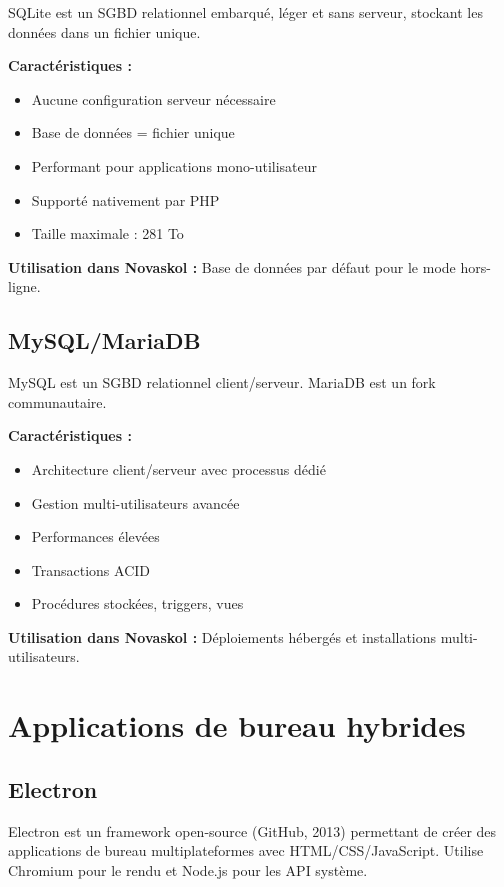 \documentclass[12pt,a4paper,twoside]{report}
\begin{document}
SQLite est un SGBD relationnel embarqué, léger et sans serveur, stockant les données dans un fichier unique.

\textbf{Caractéristiques :}
\begin{itemize}
    \item Aucune configuration serveur nécessaire
    \item Base de données = fichier unique
    \item Performant pour applications mono-utilisateur
    \item Supporté nativement par PHP
    \item Taille maximale : 281 To
\end{itemize}

\textbf{Utilisation dans Novaskol :} Base de données par défaut pour le mode hors-ligne.

\subsection{MySQL/MariaDB}

MySQL est un SGBD relationnel client/serveur. MariaDB est un fork communautaire.

\textbf{Caractéristiques :}
\begin{itemize}
    \item Architecture client/serveur avec processus dédié
    \item Gestion multi-utilisateurs avancée
    \item Performances élevées
    \item Transactions ACID
    \item Procédures stockées, triggers, vues
\end{itemize}

\textbf{Utilisation dans Novaskol :} Déploiements hébergés et installations multi-utilisateurs.

\section{Applications de bureau hybrides}

\subsection{Electron}

Electron est un framework open-source (GitHub, 2013) permettant de créer des applications de bureau multiplateformes avec HTML/CSS/JavaScript. Utilise Chromium pour le rendu et Node.js pour les API système.
\end{document}
